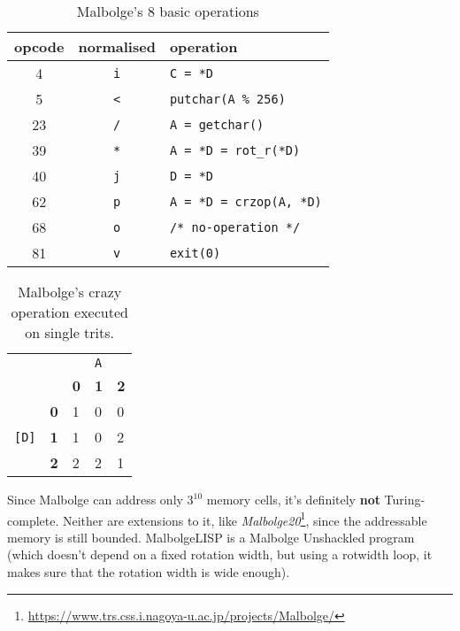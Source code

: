 \begin{table}[H]
\centering
\begin{tabular}{|c|c|l|}
\hline
opcode & normalised         & operation                    \\ \hline
4      & \verb|i|           & \verb|C = *D|                \\ \hline
5      & \verb|<|           & \verb|putchar(A % 256)|      \\ \hline
23     & \verb|/|           & \verb|A = getchar()|         \\ \hline
39     & \verb|*|           & \verb|A = *D = rot_r(*D)|    \\ \hline
40     & \verb|j|           & \verb|D = *D|                \\ \hline
62     & \verb|p|           & \verb|A = *D = crzop(A, *D)| \\ \hline
68     & \verb|o|           & \verb|/* no-operation */|    \\ \hline
81     & \verb|v|           & \verb|exit(0)|               \\ \hline
\end{tabular}
\caption{Malbolge's 8 basic operations}
\end{table}

\begin{table}
\centering
\begin{tabular}{|ll|lll|}
\hline
                      &            & \multicolumn{1}{c}{}            & \verb|A|                         &            \\
                      &            & \multicolumn{1}{l|}{\textbf{0}} & \multicolumn{1}{l|}{\textbf{1}} & \textbf{2} \\ \hline
\multicolumn{1}{|c}{} & \textbf{0} & \multicolumn{1}{l|}{1}          & \multicolumn{1}{l|}{0}          & 0          \\ \cline{2-5} 
\verb|[D]|               & \textbf{1} & \multicolumn{1}{l|}{1}          & \multicolumn{1}{l|}{0}          & 2          \\ \cline{2-5} 
                      & \textbf{2} & \multicolumn{1}{l|}{2}          & \multicolumn{1}{l|}{2}          & 1          \\ \hline
\end{tabular}
\caption{Malbolge's crazy operation executed on single trits.}
\end{table}

\par Since Malbolge can address only $3^{10}$ memory cells, it's definitely \textbf{not} Turing-complete. Neither are extensions to it, like \textit{Malbolge20}\footnote{\url{https://www.trs.css.i.nagoya-u.ac.jp/projects/Malbolge/}}, since the addressable memory is still bounded. MalbolgeLISP is a Malbolge Unshackled program (which doesn't depend on a fixed rotation width, but using a rotwidth loop, it makes sure that the rotation width is wide enough).

